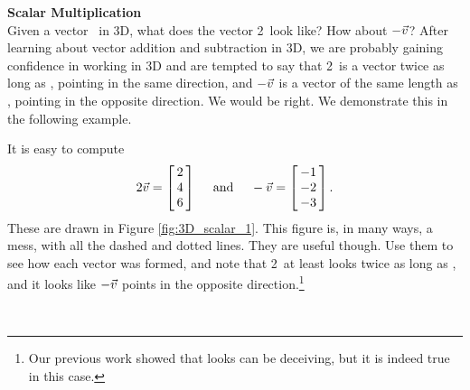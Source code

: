 \noindent \large \textsf{\textbf{Scalar Multiplication}} \normalsize\\

Given a vector \vv\ in 3D, what does the vector 2\vv\ look like? How about $-\vv$? After learning about vector addition and subtraction in 3D, we are probably gaining confidence in working in 3D and are tempted to say that 2\vv\ is a vector twice as long as \vv, pointing in the same direction, and $-\vv$ is a vector of the same length as \vv, pointing in the opposite direction. We would be right. We demonstrate this in the following example.\\

{\begin{myfigure}
\begin{center}
\end{center}
\label{fig:3D_scalar_1}
\end{myfigure}

It is easy to compute $$2\vv = \bmx{c}2\\4\\6\emx \quad \text{ and } \quad -\vv = \bmx{c} -1\\-2\\-3\emx.$$ These are drawn in Figure \ref{fig:3D_scalar_1}. This figure is, in many ways, a mess, with all the dashed and dotted lines. They are useful though. Use them to see how each vector was formed, and note that 2\vv\ at least looks twice as long as \vv, and it looks like $-\vv$ points in the opposite direction.\footnote{Our previous work showed that looks can be deceiving, but it is indeed true in this case.} }\\ %

